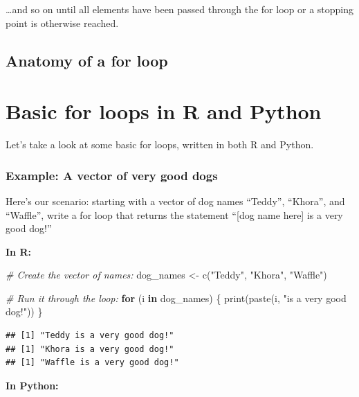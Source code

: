\documentclass[
]{book}
\newenvironment{Shaded}{\begin{snugshade}}{\end{snugshade}}
\newcommand{\CommentTok}[1]{\textcolor[rgb]{0.56,0.35,0.01}{\textit{#1}}}
\newcommand{\ControlFlowTok}[1]{\textcolor[rgb]{0.13,0.29,0.53}{\textbf{#1}}}
\newcommand{\FunctionTok}[1]{\textcolor[rgb]{0.00,0.00,0.00}{#1}}
\newcommand{\NormalTok}[1]{#1}
\newcommand{\OtherTok}[1]{\textcolor[rgb]{0.56,0.35,0.01}{#1}}
\newcommand{\StringTok}[1]{\textcolor[rgb]{0.31,0.60,0.02}{#1}}
\begin{document}
\ldots and so on until all elements have been passed through the for loop or a stopping point is otherwise reached.

\hypertarget{anatomy-of-a-for-loop}{%
\subsection{Anatomy of a for loop}\label{anatomy-of-a-for-loop}}

\hypertarget{basic-for-loops-in-r-and-python}{%
\section{Basic for loops in R and Python}\label{basic-for-loops-in-r-and-python}}

Let's take a look at some basic for loops, written in both R and Python.

\hypertarget{example-a-vector-of-very-good-dogs}{%
\subsubsection{Example: A vector of very good dogs}\label{example-a-vector-of-very-good-dogs}}

Here's our scenario: starting with a vector of dog names ``Teddy'', ``Khora'', and ``Waffle'', write a for loop that returns the statement ``{[}dog name here{]} is a very good dog!''

\textbf{In R:}

\begin{Shaded}
\begin{Highlighting}[]
\CommentTok{\# Create the vector of names:}
\NormalTok{dog\_names }\OtherTok{\textless{}{-}} \FunctionTok{c}\NormalTok{(}\StringTok{"Teddy"}\NormalTok{, }\StringTok{"Khora"}\NormalTok{, }\StringTok{"Waffle"}\NormalTok{)}

\CommentTok{\# Run it through the loop:}
\ControlFlowTok{for}\NormalTok{ (i }\ControlFlowTok{in}\NormalTok{ dog\_names) \{}
  \FunctionTok{print}\NormalTok{(}\FunctionTok{paste}\NormalTok{(i, }\StringTok{"is a very good dog!"}\NormalTok{))}
\NormalTok{\}}
\end{Highlighting}
\end{Shaded}

\begin{verbatim}
## [1] "Teddy is a very good dog!"
## [1] "Khora is a very good dog!"
## [1] "Waffle is a very good dog!"
\end{verbatim}

\textbf{In Python:}
\end{document}
